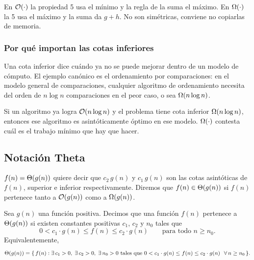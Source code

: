 \documentclass[11pt,letterpaper]{article}
\begin{document}
\begin{ojo}
    En $\mathcal{O}\!\left(\cdot\right)$ la propiedad 5 usa el mínimo y la regla de la
    suma el máximo. En $\Omega\!\left(\cdot\right)$ la 5 usa el máximo y la suma da
    $g + h$. No son simétricas, conviene no copiarlas de memoria.
\end{ojo}

\subsubsection*{Por qué importan las cotas inferiores}

Una cota inferior dice cuándo ya no se puede mejorar dentro de un
modelo de cómputo. El ejemplo canónico es el ordenamiento por
comparaciones: en el modelo general de comparaciones, cualquier
algoritmo de ordenamiento necesita del orden de $n \log n$
comparaciones en el peor caso, o sea $\Omega\!\left(n \log n\right)$.

\begin{idea}
    Si un algoritmo ya logra $\mathcal{O}\!\left(n \log n\right)$ y el problema tiene cota
    inferior $\Omega\!\left(n \log n\right)$, entonces ese algoritmo es
    asintóticamente óptimo en ese modelo. $\Omega\!\left(\cdot\right)$ contesta cuál
    es el trabajo mínimo que hay que hacer.
\end{idea}


\subsection*{Notación Theta}

$f(n) = \Theta\!\left(g(n)\right)$ quiere decir que $c_2\,g(n)$ y $c_1\,g(n)$ son las
cotas asintóticas de $f(n)$, superior e inferior respectivamente.
Diremos que $f(n) \in \Theta\!\left(g(n)\right)$ si $f(n)$ pertenece tanto a
$\mathcal{O}\!\left(g(n)\right)$ como a $\Omega\!\left(g(n)\right)$.

\begin{definicion}
  Sea $g(n)$ una función positiva. Decimos que una función $f(n)$
  pertenece a $\Theta\!\left(g(n)\right)$ si existen constantes positivas $c_1$,
  $c_2$ y $n_0$ tales que
  \[
    0 < c_1 \cdot g(n) \leq f(n) \leq c_2 \cdot g(n)
    \qquad \text{para todo } n \geq n_0 .
  \]
  Equivalentemente,
  \[
    \Theta\!\left(g(n)\right) = \{\, f(n) : \exists\, c_1 > 0,\; \exists\, c_2 > 0,\;
    \exists\, n_0 > 0 \ \text{tales que}\
    0 < c_1 \cdot g(n) \leq f(n) \leq c_2 \cdot g(n)
    \ \ \forall\, n \geq n_0 \,\}.
  \]
\end{definicion}
\end{document}
